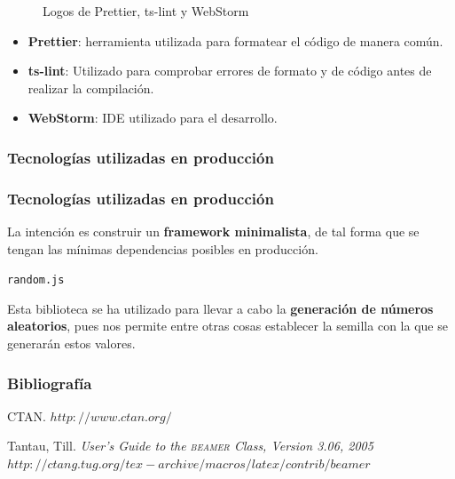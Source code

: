 \documentclass{beamer}
\newcommand{\beamer}{\textsc{beamer}}
\begin{document}
\begin{frame}
\begin{figure}
    \caption{Logos de Prettier, ts-lint y WebStorm}
    \label{fig:1}
\end{figure}

\begin{itemize}
    \item \textbf{Prettier}: herramienta utilizada para formatear el código de manera común.
    \item \textbf{ts-lint}: Utilizado para comprobar errores de formato y de código antes de realizar la compilación.
    \item \textbf{WebStorm}: IDE utilizado para el desarrollo.
\end{itemize}

\end{frame}

\subsubsection{Tecnologías utilizadas en producción}

\begin{frame}
\frametitle{Tecnologías utilizadas en producción}

La intención es construir un \textbf{framework minimalista}, de tal forma que se tengan las mínimas dependencias posibles en producción.

\begin{center}
    \Huge \texttt{random.js}
\end{center}

\bigskip

Esta biblioteca se ha utilizado para llevar a cabo la \textbf{generación de números aleatorios}, pues nos permite entre otras cosas establecer la semilla con la que se generarán estos valores.

\end{frame}

\begin{frame}
  \frametitle{Bibliografía}

  \begin{thebibliography}{10}

    \beamertemplatebookbibitems
    CTAN. {\small $http://www.ctan.org/$}

    \beamertemplatebookbibitems
    Tantau, Till. 
    \emph{User's Guide to the \beamer{} Class, Version 3.06, 2005} 
    {\small $http://ctang.tug.org/tex-archive/macros/latex/contrib/beamer$}


  \end{thebibliography}
\end{frame}
\end{document}
